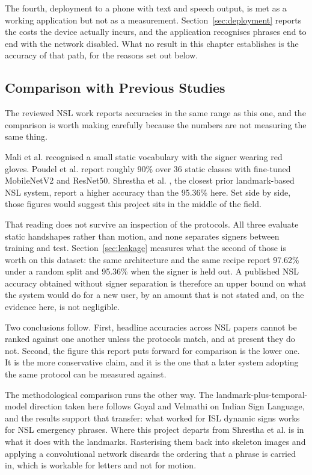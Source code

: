 The fourth, deployment to a phone with text and speech output, is met as a working application but not as a measurement. Section~\ref{sec:deployment} reports the costs the device actually incurs, and the application recognises phrases end to end with the network disabled. What no result in this chapter establishes is the accuracy of that path, for the reasons set out below.

\subsection{Comparison with Previous Studies}

The reviewed NSL work reports accuracies in the same range as this one, and the comparison is worth making carefully because the numbers are not measuring the same thing.

Mali et al. \cite{mali2018nsl} recognised a small static vocabulary with the signer wearing red gloves. Poudel et al. \cite{poudel2025nsl} report roughly 90\% over 36 static classes with fine-tuned MobileNetV2 and ResNet50. Shrestha et al. \cite{shrestha2024nsl}, the closest prior landmark-based NSL system, report a higher accuracy than the 95.36\% here. Set side by side, those figures would suggest this project sits in the middle of the field.

That reading does not survive an inspection of the protocols. All three evaluate static handshapes rather than motion, and none separates signers between training and test. Section~\ref{sec:leakage} measures what the second of those is worth on this dataset: the same architecture and the same recipe report 97.62\% under a random split and 95.36\% when the signer is held out. A published NSL accuracy obtained without signer separation is therefore an upper bound on what the system would do for a new user, by an amount that is not stated and, on the evidence here, is not negligible.

Two conclusions follow. First, headline accuracies across NSL papers cannot be ranked against one another unless the protocols match, and at present they do not. Second, the figure this report puts forward for comparison is the lower one. It is the more conservative claim, and it is the one that a later system adopting the same protocol can be measured against.

The methodological comparison runs the other way. The landmark-plus-temporal-model direction taken here follows Goyal and Velmathi \cite{goyal2023isl} on Indian Sign Language, and the results support that transfer: what worked for ISL dynamic signs works for NSL emergency phrases. Where this project departs from Shrestha et al. \cite{shrestha2024nsl} is in what it does with the landmarks. Rasterising them back into skeleton images and applying a convolutional network discards the ordering that a phrase is carried in, which is workable for letters and not for motion.


